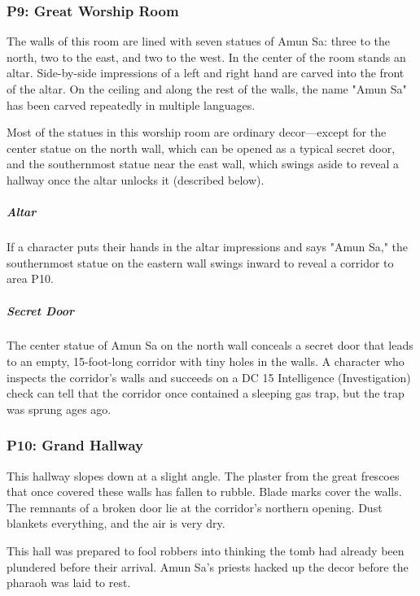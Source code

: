 \documentclass[10pt,a4paper,twoside,bg=print,twocolumn,openany,nodeprecatedcode]{dndbook}
\begin{document}
\subsubsection{P9: Great Worship Room}
\begin{DndReadAloud}{}
The walls of this room are lined with seven statues of Amun Sa: three to the north, two to the east, and two to the west. In the center of the room stands an altar. Side-by-side impressions of a left and right hand are carved into the front of the altar. On the ceiling and along the rest of the walls, the name "Amun Sa" has been carved repeatedly in multiple languages.

\end{DndReadAloud}

Most of the statues in this worship room are ordinary decor—except for the center statue on the north wall, which can be opened as a typical secret door, and the southernmost statue near the east wall, which swings aside to reveal a hallway once the altar unlocks it (described below).

\subparagraph{Altar}
If a character puts their hands in the altar impressions and says "Amun Sa," the southernmost statue on the eastern wall swings inward to reveal a corridor to area P10.

\subparagraph{Secret Door}
The center statue of Amun Sa on the north wall conceals a secret door that leads to an empty, 15-foot-long corridor with tiny holes in the walls. A character who inspects the corridor's walls and succeeds on a DC 15 Intelligence (Investigation) check can tell that the corridor once contained a sleeping gas trap, but the trap was sprung ages ago.

\subsubsection{P10: Grand Hallway}
\begin{DndReadAloud}{}
This hallway slopes down at a slight angle. The plaster from the great frescoes that once covered these walls has fallen to rubble. Blade marks cover the walls. The remnants of a broken door lie at the corridor's northern opening. Dust blankets everything, and the air is very dry.

\end{DndReadAloud}

This hall was prepared to fool robbers into thinking the tomb had already been plundered before their arrival. Amun Sa's priests hacked up the decor before the pharaoh was laid to rest.
\end{document}
